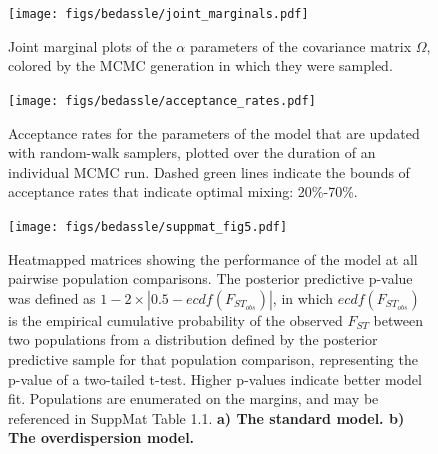 \begin{figure}[ht!]
\begin{center}
  \texttt{[image: figs/bedassle/joint\_marginals.pdf]}
 \caption{
 		\textmd{Joint marginal plots of the $\alpha$ parameters of the covariance matrix $\Omega$, colored by the MCMC  generation in which they were sampled.}
 \label{sfig:joint_marginals}
  }
\end{center}
\end{figure}

\begin{figure}[ht!]
\begin{center}
  \texttt{[image: figs/bedassle/acceptance\_rates.pdf]}
 \caption{
 		\textmd{Acceptance rates for the parameters of the model that are updated with random-walk samplers, plotted over the duration of an individual MCMC run.  Dashed green lines indicate the bounds of acceptance rates that indicate optimal mixing: 20\%-70\%.}
 \label{sfig:acceptance_rates}
  }
\end{center}
\end{figure}


\begin{figure}[ht!]
\begin{center}
  \texttt{[image: figs/bedassle/suppmat\_fig5.pdf]}
 \caption{
		\textmd{Heatmapped matrices showing the performance of the model at all pairwise population comparisons.  The posterior predictive p-value was defined as 
		$1-2 \times |0.5-ecdf(F_{ST_{obs}})|$, in which $ecdf(F_{ST_{obs}})$ is the empirical cumulative probability of the observed $F_{ST}$ between two populations from a distribution defined by the posterior predictive sample for that population comparison, representing the p-value of a two-tailed t-test.  Higher p-values indicate better model fit.  Populations are enumerated on the margins, and may be referenced in SuppMat Table 1.1.}
	\bf{a)}
 		\textmd{The standard model.}
	\bf{b)}
 		\textmd{The overdispersion model.}
 \label{sfig:zea.pps.pval}
  }
\end{center}
\end{figure}

